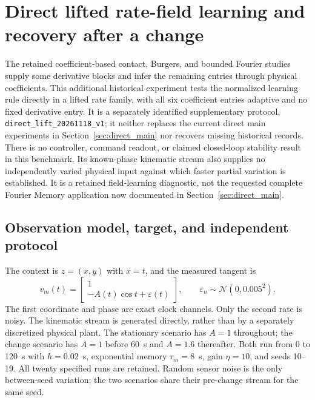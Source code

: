 \documentclass[journal]{IEEEtran}
\begin{document}
\section{Direct lifted rate-field learning and recovery after a change}
\label{sec:direct_lift_results}
The retained coefficient-based contact, Burgers, and bounded Fourier studies
supply some derivative blocks and infer the remaining entries through physical
coefficients. This additional historical experiment
tests the normalized learning rule directly in a lifted rate family, with
all six coefficient entries adaptive and no fixed derivative entry.
It is a separately identified supplementary protocol,
\texttt{direct\_lift\_20261118\_v1}; it neither replaces the current direct
main experiments in Section~\ref{sec:direct_main} nor recovers missing
historical records. There is no controller,
command readout, or claimed closed-loop stability result in this benchmark.
Its known-phase kinematic stream also supplies no independently varied
physical input against which faster partial variation is established.
It is a retained field-learning diagnostic, not the requested complete
Fourier Memory application now documented in Section~\ref{sec:direct_main}.

\subsection{Observation model, target, and independent protocol}
The context is $z=(x,y)$ with $x=t$, and the measured tangent is
\begin{equation}
 v_m(t)=\begin{bmatrix}1\\-A(t)\cos t+\varepsilon(t)\end{bmatrix},
 \qquad \varepsilon_n\sim\mathcal N(0,0.005^2).
 \label{eq:direct_observations}
\end{equation}
The first coordinate and phase are exact clock channels. Only the second
rate is noisy. The kinematic stream is generated directly, rather than
by a separately discretized physical plant. The stationary scenario has
$A=1$ throughout; the change scenario has $A=1$ before 60~s and $A=1.6$
thereafter. Both run from 0 to 120~s with $h=0.02$~s, exponential memory
$\tau_m=8$~s, gain $\eta=10$, and seeds 10--19. All twenty specified
runs are retained. Random sensor noise is the only between-seed variation;
the two scenarios share their pre-change stream for the same seed.
\end{document}
